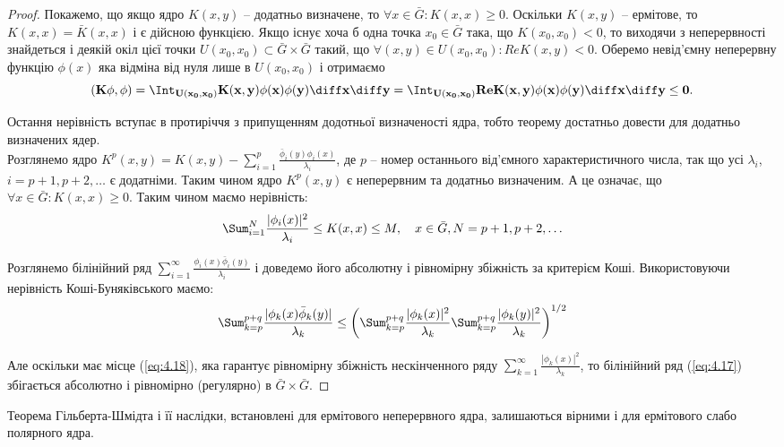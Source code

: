\begin{proof}
    Покажемо, що якщо ядро $K(x,y)$ -- додатньо визначене, то $\forall x\in\bar G:K(x,x)\ge0$. Оскільки $K(x,y)$ -- ермітове, то $K(x,x)=\bar K(x,x)$ і є дійсною функцією. Якщо існує хоча б одна точка $x_0\in\bar G$ така, що $K(x_0,x_0)<0$, то виходячи з неперервності знайдеться і деякій окіл цієї точки $U(x_0,x_0)\subset\bar G\times\bar G$ такий, що $\forall(x,y)\in U(x_0,x_0):Re K(x,y)<0$. Оберемо невід’ємну неперервну функцію $\phi(x)$ яка відміна від нуля лише в $U(x_0,x_0)$ і отримаємо \[ (\bf{K}\phi,\phi)=\Int_{U(x_0,x_0)}K(x,y)\phi(x)\phi(y)\diff x\diff y=\Int_{U(x_0,x_0)}Re K(x,y)\phi(x)\phi(y)\diff x\diff y\le0.\] 

    Остання нерівність вступає в протиріччя з припущенням додотньої визначеності ядра, тобто теорему достатньо довести для додатньо визначених ядер. \\

    Розглянемо ядро $K^p(x,y)=K(x,y)-\sum_{i=1}^p\frac{\bar\phi_i(y)\phi_i(x)}{\lambda_i}$, де $p$ -- номер останнього від’ємного характеристичного числа, так що усі $\lambda_i$, $i=p+1,p+2,\ldots$ є додатніми. Таким чином ядро $K^p(x,y)$ є неперервним та додатньо визначеним. А це означає, що $\forall x\in\bar G:K(x,x)\ge0$. Таким чином маємо нерівність:
    \begin{equation}
        \label{eq:4.18}
        \Sum_{i=1}^N\dfrac{|\phi_i(x)|^2}{\lambda_i}\le K(x,x)\le M,\quad x\in\bar G, N=p+1,p+2,\ldots
    \end{equation}

    Розглянемо білінійний ряд $\sum_{i=1}^\infty\frac{\phi_i(x)\bar\phi_i(y)}{\lambda_i}$ і доведемо його абсолютну і рівномірну збіжність за критерієм Коші. Використовуючи нерівність Коші-Буняківського маємо:
    \begin{equation}
        \label{eq:4.19}
        \Sum_{k=p}^{p+q}\dfrac{|\phi_k(x)\bar\phi_k(y)|}{\lambda_k}\le\left(\Sum_{k=p}^{p+q}\dfrac{|\phi_k(x)|^2}{\lambda_k}\Sum_{k=p}^{p+q}\dfrac{|\phi_k(y)|^2}{\lambda_k}\right)^{1/2}
    \end{equation}

    Але оскільки має місце (\ref{eq:4.18}), яка гарантує рівномірну збіжність нескінченного ряду $\sum_{k=1}^\infty\frac{|\phi_k(x)|^2}{\lambda_k}$, то білінійний ряд (\ref{eq:4.17}) збігається абсолютно і рівномірно (регулярно) в $\bar G\times\bar G$.
\end{proof}

\begin{remark}
    Теорема Гільберта-Шмідта і її наслідки, встановлені для ермітового неперервного ядра, залишаються вірними і для ермітового слабо полярного ядра.
\end{remark}

